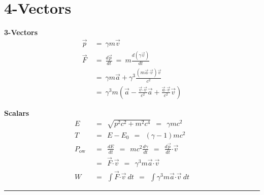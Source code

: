 \documentclass[12pt]{article}
\newcommand{\dotP}{\boldsymbol \cdot}		%
\begin{document}
\newpage
\section{4-Vectors}

\begin{minipage}[t]{0.45\textwidth}
	\textbf{3-Vectors}
	\begin{align*}
		\vec{p} &\ =\ \boxed{ \gamma m \vec{v} } \\[10pt]
		\vec{F} &\ =\ \tfrac{d\vec{p}}{dt} \ =\ m\tfrac{d(\gamma \vec{v})}{dt}\\[2pt]
		&\ =\ \gamma m\vec{a}+\gamma^3 \tfrac{(m\vec{a}\dotP\vec{v})\vec{v}}{c^2}\\[2pt]
		&\ =\ \boxed{ \gamma^3 m(\vec{a} - \tfrac{\vec{v}\dotP\vec{v}}{c^2}\vec{a} + \tfrac{\vec{a} \dotP \vec{v}}{c^2}\vec{v}) }
	\end{align*}
\end{minipage}
\hfill
\begin{minipage}[t]{0.49\textwidth}
	\textbf{Scalars}
	\begin{align*}
		E &\ \ =\ \ \boxed{ \sqrt{p^2c^2 + m^2c^4} \ \ =\ \ \gamma mc^2 }\\[3pt]
		T &\ \ =\ \ E - E_0 \ \ =\ \ \boxed{(\gamma-1)mc^2}\\[3pt]
		P_\text{ow} &\ \ =\ \ \tfrac{dE}{dt} \ \ =\ \ mc^2 \tfrac{d\gamma}{dt} \ \ =\ \ \tfrac{d\vec{p}}{dt} \dotP \vec{v}\\[2pt]
		&\ \ = \ \ \boxed{ \vec{F} \dotP \vec{v} \ \ = \ \ \gamma^3 m\vec{a} \dotP \vec{v} }\\[3pt]
		W &\ \ = \ \ \int \vec{F} \dotP \vec{v}\ dt \ \ =\ \ \boxed{ \int \gamma^3 m\vec{a} \dotP \vec{v}\ dt }
	\end{align*}
\end{minipage}

\vspace{10pt}\noindent
\rule{1\textwidth}{.5pt}

\vspace{-10pt}
\end{document}
